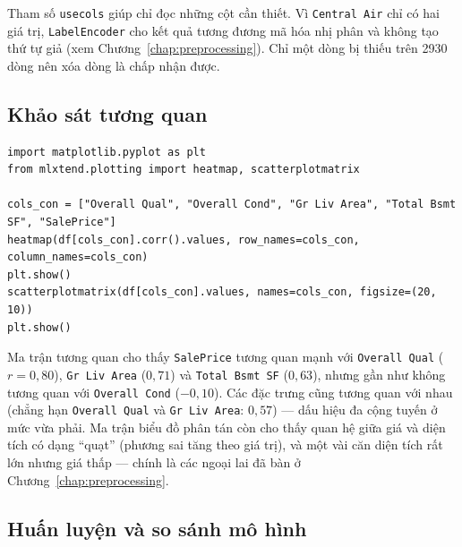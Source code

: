 Tham số \texttt{usecols} giúp chỉ đọc những cột cần thiết. Vì \texttt{Central Air} chỉ có hai giá trị, \texttt{LabelEncoder} cho kết quả tương đương mã hóa nhị phân và không tạo thứ tự giả (xem Chương~\ref{chap:preprocessing}). Chỉ một dòng bị thiếu trên 2930 dòng nên xóa dòng là chấp nhận được.

\subsection{Khảo sát tương quan}

\begin{lstlisting}[caption={Lab 1 -- ma trận tương quan và ma trận biểu đồ phân tán}]
import matplotlib.pyplot as plt
from mlxtend.plotting import heatmap, scatterplotmatrix

cols_con = ["Overall Qual", "Overall Cond", "Gr Liv Area", "Total Bsmt SF", "SalePrice"]
heatmap(df[cols_con].corr().values, row_names=cols_con, column_names=cols_con)
plt.show()
scatterplotmatrix(df[cols_con].values, names=cols_con, figsize=(20, 10))
plt.show()
\end{lstlisting}



Ma trận tương quan cho thấy \texttt{SalePrice} tương quan mạnh với \texttt{Overall Qual} ($r = 0{,}80$), \texttt{Gr Liv Area} ($0{,}71$) và \texttt{Total Bsmt SF} ($0{,}63$), nhưng gần như không tương quan với \texttt{Overall Cond} ($-0{,}10$). Các đặc trưng cũng tương quan với nhau (chẳng hạn \texttt{Overall Qual} và \texttt{Gr Liv Area}: $0{,}57$) --- dấu hiệu đa cộng tuyến ở mức vừa phải. Ma trận biểu đồ phân tán còn cho thấy quan hệ giữa giá và diện tích có dạng ``quạt'' (phương sai tăng theo giá trị), và một vài căn diện tích rất lớn nhưng giá thấp --- chính là các ngoại lai đã bàn ở Chương~\ref{chap:preprocessing}.

\subsection{Huấn luyện và so sánh mô hình}

